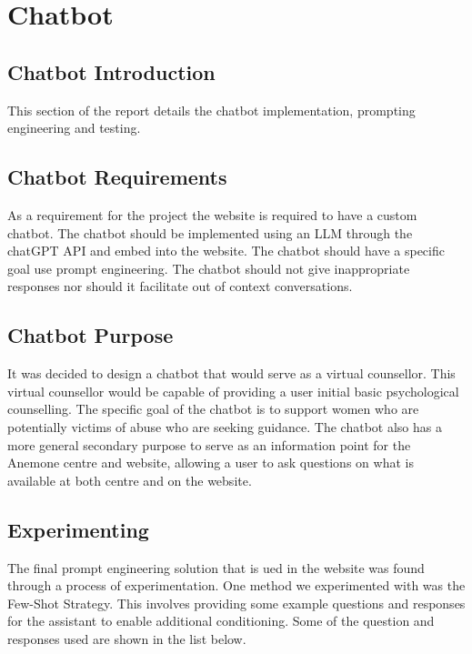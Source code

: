 \section{Chatbot}
\subsection{Chatbot Introduction}


This section of the report details the chatbot implementation, prompting engineering and testing. 

\subsection{Chatbot Requirements}
As a requirement for the project the website is required to have a custom chatbot. 
The chatbot should be implemented using an LLM through the chatGPT API and embed into the website. 
The chatbot should have a specific goal use prompt engineering. 
The chatbot should not give inappropriate responses nor should it facilitate out of context conversations.

\subsection{Chatbot Purpose}
It was decided to design a chatbot that would serve as a virtual counsellor. 
This virtual counsellor would be capable of providing a user initial basic psychological counselling.
The specific goal of the chatbot is to support women who are potentially victims of abuse who are seeking guidance. 
The chatbot also has a more general secondary purpose to serve as an information point for the Anemone centre and website, 
allowing a user to ask questions on what is available at both centre and on the website. 

\subsection{Experimenting}

The final prompt engineering solution that is ued in the website was found through a process of experimentation. One method we experimented with was the Few-Shot Strategy. This involves providing some example questions and responses for the assistant to enable additional conditioning. 
Some of the question and responses used are shown in the list below. 

